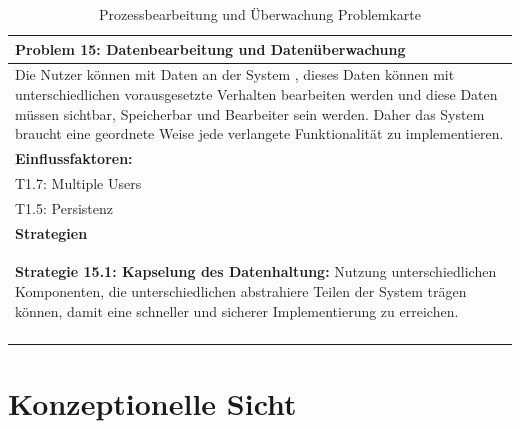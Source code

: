 \documentclass[enabledeprecatedfontcommands,fontsize=12pt,paper=a4,twoside]{scrartcl}
\begin{document}
\begin{table}[H]
    \centering
    \begin{tabular}{|p{15cm}|}
    \hline
          \textbf{Problem 15:} Datenbearbeitung und Datenüberwachung %
          \\ \hline
          Die Nutzer können mit Daten an der System , dieses Daten können mit unterschiedlichen vorausgesetzte  Verhalten bearbeiten werden und diese Daten müssen sichtbar, Speicherbar und Bearbeiter sein werden. Daher das System braucht eine geordnete Weise jede verlangete Funktionalität zu implementieren.

          \\ \hline
          \textbf{Einflussfaktoren: } \\
          T1.7: Multiple Users\\
	      T1.5: Persistenz\\
          \hline
          \textbf{Strategien} \\ \hline

            \textbf{Strategie 15.1: Kapselung des Datenhaltung:} Nutzung unterschiedlichen Komponenten, die unterschiedlichen abstrahiere Teilen der System trägen können, damit eine schneller und sicherer Implementierung  zu erreichen.

             \label{sec:strategie15} \\
          \\ \hline
    \end{tabular}
    \caption{Prozessbearbeitung und Überwachung Problemkarte}
    \label{tab:ProblemKarte15}
\end{table}




\section{Konzeptionelle Sicht}
\label{sec:konzeptionell}
\end{document}
